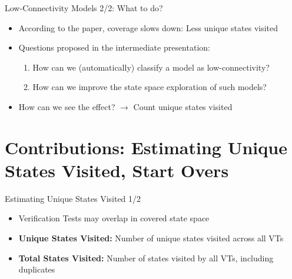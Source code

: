 \documentclass[aspectratio=169]{beamer}
\begin{document}
\begin{frame}{Low-Connectivity Models 2/2: What to do?}
    \begin{itemize}
        \item According to the paper, coverage slows down: Less unique states visited
        \item Questions proposed in the intermediate presentation:
              \begin{enumerate}
                  \item How can we (automatically) classify a model as low-connectivity?
                  \item How can we improve the state space exploration of such models?
              \end{enumerate}
        \item How can we see the effect? $\rightarrow$ Count unique states visited
    \end{itemize}
\end{frame}

\section{Contributions: Estimating Unique States Visited, Start Overs}

\begin{frame}{Estimating Unique States Visited 1/2}
    \begin{itemize}
        \item Verification Tests may overlap in covered state space
        \item \textbf{Unique States Visited:} Number of unique states visited across all VTs
        \item \textbf{Total States Visited:} Number of states visited by all VTs, including duplicates
    \end{itemize}
\end{frame}
\end{document}
